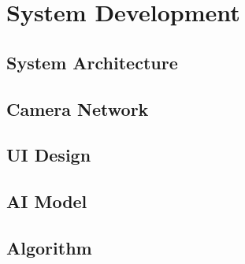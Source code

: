\chapter{System Development}
\lipsum[1]


\section{System Architecture}
\lipsum[1-4]

\section{Camera Network}
\lipsum[1-3]

\section{UI Design}
\lipsum[1-3]

\section{AI Model}
\lipsum[1-3]

\section{Algorithm}
\lipsum[1-3]